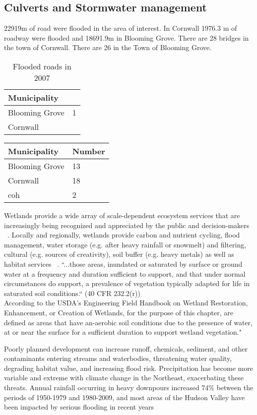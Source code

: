 \subsection{Culverts and Stormwater management}
22919m of road were flooded in the area of interest.
In Cornwall 1976.3 m of roadway were flooded and 18691.9m in Blooming Grove. There are 28 bridges in the town of Cornwall. There are 26 in the Town of Blooming Grove.
\begin{table}
    \begin{tabular}{l c } 
    Municipality & \\
    \hline
    Blooming Grove & 1 \\
    Cornwall & \\
    \end{tabular}
    \caption{Flooded roads in 2007}
    \label{tab:flooded_roads}
\end{table}

\begin{table}
\begin{tabular}{p{7cm} p{7cm}}
\label{tab:culverts}
Municipality & Number\\
\hline
Blooming Grove & 13\\
Cornwall & 18\\
\acrlong{coh} & 2\\
\end{tabular}
\end{table}

Wetlands provide a wide array of scale-dependent ecosystem services that are 
increasingly being recognized and appreciated by the public and decision-makers 
~\citep{poschlod2007}. Locally and regionally, wetlands provide carbon and nutrient 
cycling, flood management, water storage (e.g. after heavy rainfall or 
snowmelt) and filtering, cultural (e.g. sources of creativity), soil buffer 
(e.g. heavy metals) as well as habitat services ~\citep{poschlod2007}. ``...those 
areas, inundated or saturated by surface or ground water at a frequency and 
duration sufficient to support, and that under normal circumstances do support, 
a prevalence of vegetation typically adapted for life in saturated soil 
conditions.“ (40 CFR 232.2(r)) \\ %
According to the USDA's 
Engineering Field Handbook on Wetland Restoration, Enhancement, or Creation of 
Wetlands, for the purpose of this chapter, are defined as areas that have 
an-aerobic soil conditions due to the presence of water, at or near the surface 
for a sufficient duration to support wetland vegetation."

Poorly planned development can increase runoff, chemicals, sediment, and other 
contaminants entering streams and waterbodies, threatening water quality, 
degrading habitat value, and increasing flood risk. Precipitation has become 
more variable and extreme with climate change in the Northeast, exacerbating 
these threats. Annual rainfall occurring in heavy downpours increased 74\% 
between the periods of 1950-1979 and 1980-2009, and most areas of the Hudson 
Valley have been impacted by serious flooding in recent years ~\citep{rosenzweig2011climate} 